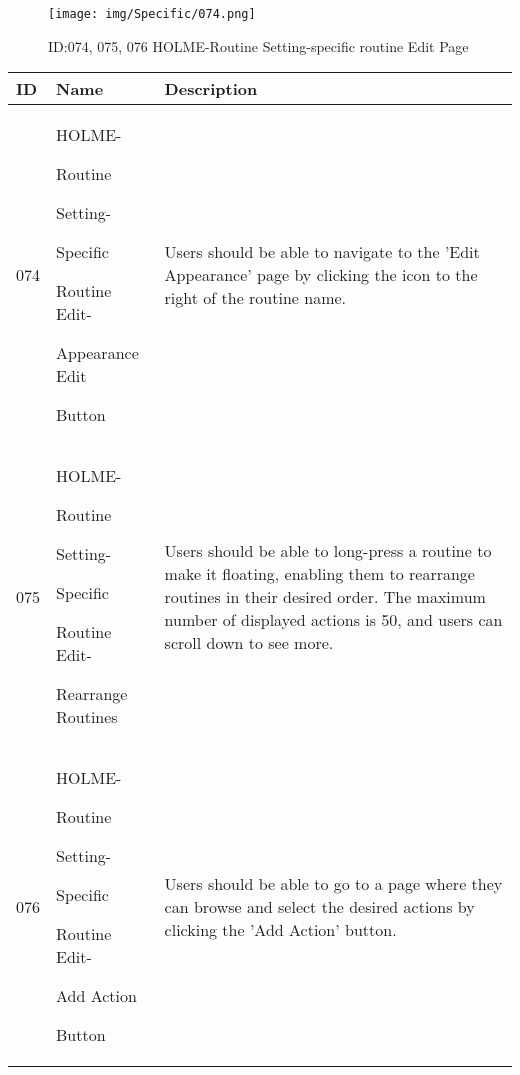 \documentclass[conference]{IEEEtran}
\begin{document}
\begin{enumerate}
\begin{figure}[h]
\centering                                         
\texttt{[image: img/Specific/074.png]}
\caption{ID:074, 075, 076 HOLME-Routine Setting-specific routine Edit Page}
\end{figure}
\begin{table}[h]
\def\arraystretch{1.2} \small
    \begin{tabular}{|p{1cm}|p{1.8cm}|p{5.0cm}|}
        \hline
        ID & Name & Description\\ \hline
         074 \par  & HOLME-\par Routine \par Setting- \par Specific  \par Routine Edit- \par Appearance Edit \par Button & 
Users should be able to navigate to the 'Edit Appearance' page by clicking the icon to the right of the routine name.\\ \hline
075 \par  & HOLME-\par Routine \par Setting- \par Specific  \par Routine Edit- \par Rearrange Routines & 
Users should be able to long-press a routine to make it floating, enabling them to rearrange routines in their desired order. The maximum number of displayed actions is 50, and users can scroll down to see more.\\ \hline
076 \par  & HOLME-\par Routine \par Setting- \par Specific  \par Routine Edit- \par Add Action \par Button & 

Users should be able to go to a page where they can browse and select the desired actions by clicking the 'Add Action' button.\\ \hline
    \end{tabular}
\end{table}
\clearpage


\end{enumerate}
\end{document}
